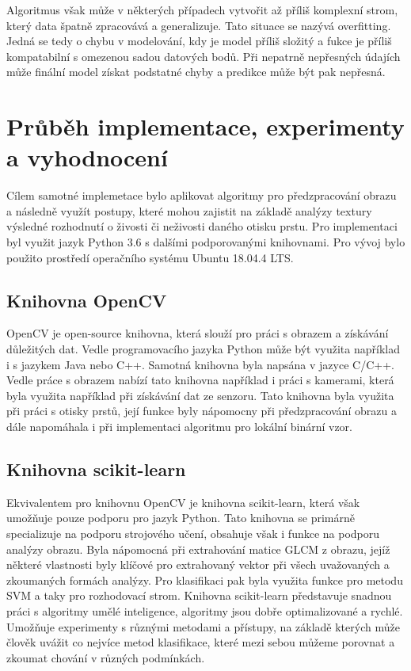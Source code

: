 Algoritmus však může v některých případech vytvořit až příliš komplexní strom, který data špatně zpracovává a generalizuje. Tato situace se nazývá overfitting. Jedná se tedy o chybu v modelování, kdy je model příliš složitý a fukce je příliš kompatabilní s omezenou sadou datových bodů. Při nepatrně nepřesných údajích může finální model získat podstatné chyby a predikce může být pak nepřesná.
    
\chapter{Průběh implementace, experimenty a vyhodnocení}
Cílem samotné implemetace bylo aplikovat algoritmy pro předzpracování obrazu a následně využít postupy, které mohou zajistit na základě analýzy textury výsledné rozhodnutí o živosti či neživosti daného otisku prstu.
Pro implementaci byl využit jazyk Python 3.6 s dalšími podporovanými knihovnami. Pro vývoj bylo použito prostředí operačního systému Ubuntu 18.04.4 LTS.

\section{Knihovna OpenCV}
OpenCV je open-source knihovna, která slouží pro práci s obrazem a získávání důležitých dat. Vedle programovacího jazyka Python může být využita například i s jazykem Java nebo C++. Samotná knihovna byla napsána v jazyce C/C++. \cite{OpenCVLibrary} Vedle práce s obrazem nabízí tato knihovna například i práci s kamerami, která byla využita například při získávání dat ze senzoru. Tato knihovna byla využita při práci s otisky prstů, její funkce byly nápomocny při předzpracování obrazu a dále napomáhala i při implementaci algoritmu pro lokální binární vzor.

\section{Knihovna scikit-learn}
Ekvivalentem pro knihovnu OpenCV je knihovna scikit-learn, která však umožňuje pouze podporu pro jazyk Python. Tato knihovna se primárně specializuje na podporu strojového učení, obsahuje však i funkce na podporu analýzy obrazu. Byla nápomocná při extrahování matice GLCM z obrazu, jejíž některé vlastnosti byly klíčové pro extrahovaný vektor při všech uvažovaných a zkoumaných formách analýzy. Pro klasifikaci pak byla využita funkce pro metodu SVM a taky pro rozhodovací strom. Knihovna scikit-learn představuje snadnou práci s algoritmy umělé inteligence, algoritmy jsou dobře optimalizované a rychlé. Umožňuje experimenty s různými metodami a přístupy, na základě kterých může člověk uvážit co nejvíce metod klasifikace, které mezi sebou můžeme porovnat a zkoumat chování v různých podmínkách.

